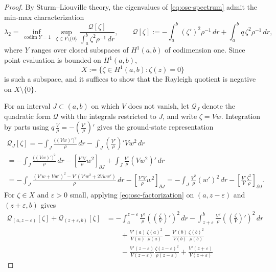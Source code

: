 \documentclass[11pt]{article}
\numberwithin{equation}{section}
\theoremstyle{definition}
\begin{document}
\begin{proof}
By Sturm--Liouville theory, the eigenvalues of \eqref{eq:osc-spectrum} admit the min-max characterization
\[
	\lambda_2 = \inf_{\operatorname{codim}Y=1}\,\sup_{\zeta\in Y\setminus\{0\}} \frac{\mathcal{Q}[\zeta]}{\int_a^b \zeta^2\rho^{-1}\,dr},
	\qquad
	\mathcal{Q}[\zeta] := -\int_a^b(\zeta')^2\rho^{-1}\,dr + \int_a^b q\,\zeta^2\rho^{-1}\,dr,
\]
where $Y$ ranges over closed subspaces of $H^1(a,b)$ of codimension one. Since point evaluation is bounded on $H^1(a,b)$,
\[
	X:=\{\zeta\in H^1(a,b):\zeta(z)=0\}
\]
is such a subspace, and it suffices to show that the Rayleigh quotient is negative on $X\setminus\{0\}$.

For an interval $J\subset(a,b)$ on which $V$ does not vanish, let $\mathcal{Q}_J$ denote the quadratic form $\mathcal{Q}$ with the integrals restricted to $J$, and write $\zeta=Vw$. Integration by parts using $q\,\frac{V}{\rho}=-\left(\frac{V'}{\rho}\right)'$ gives the ground-state representation
\begin{multline}\label{eq:osc-factorization}
    \mathcal Q_{J}[\zeta]
    =
    -\int_J \frac{\bigl((Vw)'\bigr)^2}{\rho}\,dr
    -\int_J \left(\frac{V'}{\rho}\right)' Vw^2\,dr \\
    =
    -\int_J \frac{\bigl((Vw)'\bigr)^2}{\rho}\,dr
    -\left[\frac{V'V}{\rho}w^2\right]_{\partial J}
    +\int_J \frac{V'}{\rho}(Vw^2)'\,dr \\
    =
    -\int_J
        \frac{(V'w+Vw')^2
        -V'(V'w^2+2Vww')}{\rho}\,dr
    -\left[\frac{V'V}{\rho}w^2\right]_{\partial J}
    =
    -\int_J\frac{V^2}{\rho}
        (w')^2\,dr
    -
    \left[\frac{V'}{V}\frac{\zeta^2}{\rho}\right]_{\partial J}.
\end{multline}
For $\zeta\in X$ and $\varepsilon>0$ small, applying \eqref{eq:osc-factorization} on $(a,z-\varepsilon)$ and $(z+\varepsilon,b)$ gives
\begin{align}
    \mathcal Q_{(a,z-\varepsilon)}[\zeta]
    +\mathcal Q_{(z+\varepsilon,b)}[\zeta]
    &=
    -\int_{a}^{z-\varepsilon}\frac{V^2}{\rho}
        \left(\left(\frac{\zeta}{V}\right)'\right)^2\,dr
    -\int_{z+\varepsilon}^{b}\frac{V^2}{\rho}
        \left(\left(\frac{\zeta}{V}\right)'\right)^2\,dr \nonumber\\
    &\qquad
    +\frac{V'(a)}{V(a)}\frac{\zeta(a)^2}{\rho(a)}
    -\frac{V'(b)}{V(b)}\frac{\zeta(b)^2}{\rho(b)} \nonumber\\
    &\qquad
    -\frac{V'(z-\varepsilon)}{V(z-\varepsilon)}
        \frac{\zeta(z-\varepsilon)^2}{\rho(z-\varepsilon)}
    +\frac{V'(z+\varepsilon)}{V(z+\varepsilon)}

\end{align}
\end{proof}
\end{document}
